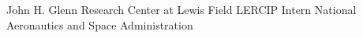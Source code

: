 \documentclass[11pt,a4paper,sans]{moderncv} %
\begin{document}
\begin{comment}		
\small
In an effort to promote research into the frontiers of Topology Data Analysis (TDA), I joined a research group at the Air Force Research Labs (AFRL) to study how to combine techniques from the field of topology with machine learning in both supervised and unsupervised settings. I primarily researched multi-scale extensions to the \textit{Mapper} framework, an often used modality for performing TDA.
The group has since founded an AI startup\footnote{See \url{https://minedxai.com/} for more details} company. 
\end{comment}


\vspace{0.75em}
			 {John H. Glenn Research Center at Lewis Field}
			 {LERCIP Intern}
			 {National Aeronautics and Space Administration}{}{}
\begin{comment}		
\small
Towards accelerating materials discovery and design, I was hired by Dr. Steven Arnold (Multiscale Modeling Materials and Structures Division) to spend an extended internship at NASA using ML to infer multiscale structural properties from material stress-response data.  
The project involved using {\em experimental design theory} to deduce process-structure-property relationships from a surrogate regression model trained on laminate stress-strain curve data.
My time was primarily spent learning basic micromechanics and lamination theory, architecting a neural network to model material stress-response data, and implementing a custom information-theoretic estimator (the loss function).  
Publications summarizing the works can be found in my CV. Other technical material including reports, presentations, and code are available upon request for U.S. citizens only. 
\end{comment}
\end{document}
